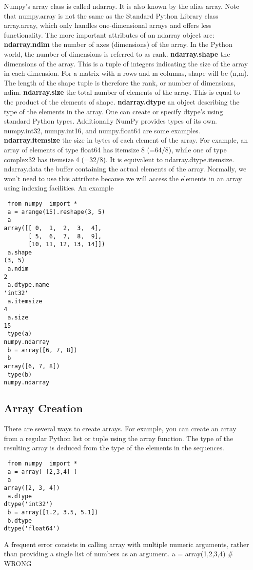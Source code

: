 Numpy's array class is called ndarray. It is also known by the alias array. Note that numpy.array is not the same as the Standard Python Library class array.array, which only handles one-dimensional arrays and offers less functionality. The more important attributes of an ndarray object are:
\textbf{ndarray.ndim}
the number of axes (dimensions) of the array. In the Python world, the number of dimensions is referred to as rank.
\textbf{ndarray.shape}
the dimensions of the array. This is a tuple of integers indicating the size of the array in each dimension. For a matrix with n rows and m columns, shape will be (n,m). The length of the shape tuple is therefore the rank, or number of dimensions, ndim.
\textbf{ndarray.size}
the total number of elements of the array. This is equal to the product of the elements of shape.
\textbf{ndarray.dtype}
an object describing the type of the elements in the array. One can create or specify dtype's using standard Python types. Additionally NumPy provides types of its own. numpy.int32, numpy.int16, and numpy.float64 are some examples.
\textbf{ndarray.itemsize}
the size in bytes of each element of the array. For example, an array of elements of type float64 has itemsize 8 (=64/8), while one of type complex32 has itemsize 4 (=32/8). It is equivalent to ndarray.dtype.itemsize.
ndarray.data
the buffer containing the actual elements of the array. Normally, we won't need to use this attribute because we will access the elements in an array using indexing facilities.
An example
\begin{verbatim}
 from numpy  import *
 a = arange(15).reshape(3, 5)
 a
array([[ 0,  1,  2,  3,  4],
       [ 5,  6,  7,  8,  9],
       [10, 11, 12, 13, 14]])
 a.shape
(3, 5)
 a.ndim
2
 a.dtype.name
'int32'
 a.itemsize
4
 a.size
15
 type(a)
numpy.ndarray
 b = array([6, 7, 8])
 b
array([6, 7, 8])
 type(b)
numpy.ndarray
\end{verbatim}
\subsection{Array Creation}
There are several ways to create arrays.
For example, you can create an array from a regular Python list or tuple using the array function. The type of the resulting array is deduced from the type of the elements in the sequences.
\begin{verbatim}
 from numpy  import *
 a = array( [2,3,4] )
 a
array([2, 3, 4])
 a.dtype
dtype('int32')
 b = array([1.2, 3.5, 5.1])
 b.dtype
dtype('float64')
\end{verbatim}
A frequent error consists in calling array with multiple numeric arguments, rather than providing a single list of numbers as an argument.
 a = array(1,2,3,4)    # WRONG

